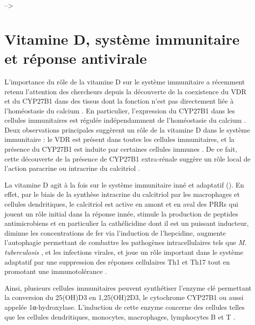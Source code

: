 \documentclass[
  a4paper,
  DIV=11,
  numbers=noendperiod,
  listof=totoc]{scrreprt}
\begin{document}
--\textgreater{}

\newpage{}

\chapter{Vitamine D, système immunitaire et réponse
antivirale}\label{vitamine-d-systuxe8me-immunitaire-et-ruxe9ponse-antivirale}

L'importance du rôle de la vitamine D sur le système immunitaire a
récemment retenu l'attention des chercheurs depuis la découverte de la
coexistence du \ac{VDR} et du \ac{CYP27B1} dans des tissus dont la
fonction n'est pas directement liée à l'homéostasie du calcium
\autocite{Zehnder.2001}. En particulier, l'expression du \ac{CYP27B1}
dans les cellules immunitaires est régulée indépendamment de
l'homéostasie du calcium \autocite{White.2022}. Deux observations
principales suggèrent un rôle de la vitamine D dans le système
immunitaire : le \ac{VDR} est présent dans toutes les cellules
immunitaires, et la présence du \ac{CYP27B1} est induite par certaines
cellules immunes \autocite{Giannini.2022}. De ce fait, cette découverte
de la présence de CYP27B1 extra-rénale suggère un rôle local de l'action
paracrine ou intracrine du calcitriol
\autocite{Hewison.2007,Bishop.2021}.

La vitamine D agit à la fois sur le système immunitaire inné et
adaptatif (). En effet, par le biais de la
synthèse intracrine du calcitriol par les macrophages et cellules
dendritiques, le calcitriol est active en amont et en aval des \acp{PRR}
qui jouent un rôle initial dans la réponse innée, stimule la production
de peptides antimicrobiens et en particulier la cathélicidine dont il
est un puissant inducteur, diminue les concentrations de fer via
l'induction de l'hepcidine, augmente l'autophagie permettant de
combattre les pathogènes intracellulaires tels que \emph{M.
tuberculosis} \autocite{Liu.2006}, et les infections virales, et joue un
rôle important dans le système adaptatif par une suppression des
réponses cellulaires \ac{Th1} et \ac{Th17} tout en promotant une
immunotolérance \autocite{Bishop.2021,Ismailova.2022}.

Ainsi, plusieurs cellules immunitaires peuvent synthétiser l'enzyme clé
permettant la conversion du \ac{25(OH)D3} en \ac{1,25(OH)2D3}, le
cytochrome \ac{CYP27B1} ou aussi appelée 1α-hydroxylase. L'induction de
cette enzyme concerne des cellules telles que les cellules dendritiques,
monocytes, macrophages, lymphocytes B et T
\autocite{Giannini.2022,Dankers.2017}.
\end{document}
